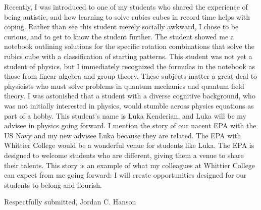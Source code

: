 \documentclass[../main.tex]{subfiles}
\begin{document}
Recently, I was introduced to one of my students who shared the experience of being autistic, and how learning to solve rubics cubes in record time helps with coping.  Rather than see this student merely socially awkward, I chose to be curious, and to get to know the student further.  The student showed me a notebook outlining solutions for the specific rotation combinations that solve the rubics cube with a classification of starting patterns.  This student was not yet a student of physics, but I immediately recognized the formulas in the notebook as those from linear algebra and group theory.  These subjects matter a great deal to physicists who must solve problems in quantum mechanics and quantum field theory.  I was astonished that a student with a diverse cognitive background, who was not initially interested in physics, would stumble across physics equations as part of a hobby.  This student's name is Luka Kenderian, and Luka will be my advisee in physics going forward.  I mention the story of our nacent EPA with the US Navy and my new advisee Luka because they are related.  The EPA with Whittier College would be a wonderful venue for students like Luka.  The EPA is designed to welcome students who are different, giving them a venue to share their talents.  This story is an example of what my colleagues at Whittier College can expect from me going forward: I will create opportunities designed for our students to belong and flourish.

Respectfully submitted,
Jordan C. Hanson
\end{document}
